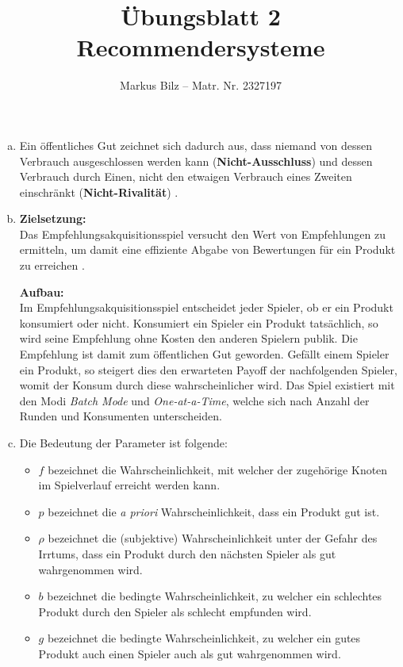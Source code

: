 \documentclass[fleqn]{article}
\begin{document}
\author{Markus Bilz -- Matr. Nr. 2327197}
\title{Übungsblatt 2 Recommendersysteme}
\maketitle

\begin{enumerate}[a)]
	\item Ein öffentliches Gut zeichnet sich dadurch aus, dass niemand von dessen Verbrauch ausgeschlossen werden kann (\textbf{Nicht-Ausschluss}) und dessen Verbrauch 
	      durch Einen, nicht den etwaigen Verbrauch eines Zweiten einschränkt (\textbf{Nicht-Rivalität}) \autocite[vgl.][S.~10]{geyer-schulz_sonnenbichler_2019}.
	\item 
	      \textbf{Zielsetzung:}\\
        Das Empfehlungsakquisitionsspiel versucht den Wert von Empfehlungen zu ermitteln, um damit eine effiziente Abgabe von Bewertungen für ein Produkt zu erreichen \autocite[vgl. ][S.~565]{avery_market_1999}.
      
        \textbf{Aufbau:}\\
         Im Empfehlungsakquisitionsspiel entscheidet jeder Spieler, ob er ein Produkt konsumiert oder nicht. Konsumiert ein Spieler ein Produkt tatsächlich, so wird seine Empfehlung ohne Kosten den anderen Spielern publik. Die Empfehlung ist damit zum öffentlichen Gut geworden. Gefällt einem Spieler ein Produkt, so steigert dies den erwarteten Payoff der nachfolgenden Spieler, womit der Konsum durch diese wahrscheinlicher wird. 
        Das Spiel existiert mit den Modi \textit{Batch Mode} und \textit{One-at-a-Time}, welche sich nach Anzahl der Runden und Konsumenten unterscheiden. \autocite[vgl.][S.~566~ff.]{avery_market_1999}

  \item \label{it:vars}
        Die Bedeutung der Parameter ist folgende:        
	      \begin{itemize}
	      	\item $f$ bezeichnet die Wahrscheinlichkeit, mit welcher der zugehörige Knoten im Spielverlauf erreicht werden kann.
	      	\item $p$ bezeichnet die \textit{a priori} Wahrscheinlichkeit, dass ein Produkt gut ist.
	      	\item $\rho$ bezeichnet die  (subjektive) Wahrscheinlichkeit unter der Gefahr des Irrtums, dass ein Produkt durch den nächsten Spieler als gut wahrgenommen wird. 
	      	\item $b$ bezeichnet die bedingte Wahrscheinlichkeit, zu welcher ein schlechtes Produkt durch den Spieler als schlecht empfunden wird.
	      	\item $g$ bezeichnet die bedingte Wahrscheinlichkeit, zu welcher ein gutes Produkt auch einen Spieler auch als gut wahrgenommen wird.
        \end{itemize}
  


\end{enumerate}
\end{document}
